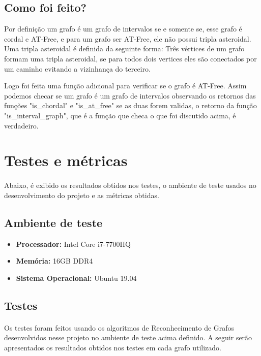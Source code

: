 \documentclass[a4paper, 11pt]{article}
\begin{document}
			\subsection{Como foi feito?}
				\par Por definição um grafo é um grafo de intervalos se e somente se, esse grafo é cordal e AT-Free, e para um grafo ser AT-Free, ele não possui tripla asteroidal. Uma tripla asteroidal é definida da seguinte forma: Três vértices de um grafo formam uma tripla asteroidal, se para todos dois vertices eles são conectados por um caminho evitando a vizinhança do terceiro. 
				\par Logo foi feita uma função adicional para verificar se o grafo é AT-Free. Assim podemos checar se um grafo é um grafo de intervalos observando os retornos das funções "is\_chordal" e "is\_at\_free" se as duas forem validas, o retorno da função "is\_interval\_graph", que é a função que checa o que foi discutido acima, é verdadeiro.
		\section{Testes e métricas}	
			\paragraph{}Abaixo, é exibido os resultados obtidos nos testes, o ambiente de teste usados no desenvolvimento do projeto e as métricas  obtidas.
			\subsection{Ambiente de teste}
				\begin{itemize}
					\item \textbf{Processador:} Intel Core i7-7700HQ
					\item \textbf{Memória:} 16GB DDR4
					\item \textbf{Sistema Operacional:} Ubuntu 19.04
				\end{itemize}
			\subsection{Testes}
				\paragraph{}Os testes foram feitos usando os algoritmos de Reconhecimento de Grafos desenvolvidos nesse projeto no ambiente de teste acima definido. A seguir serão apresentados os resultados obtidos nos testes em cada grafo utilizado.
				
\end{document}
